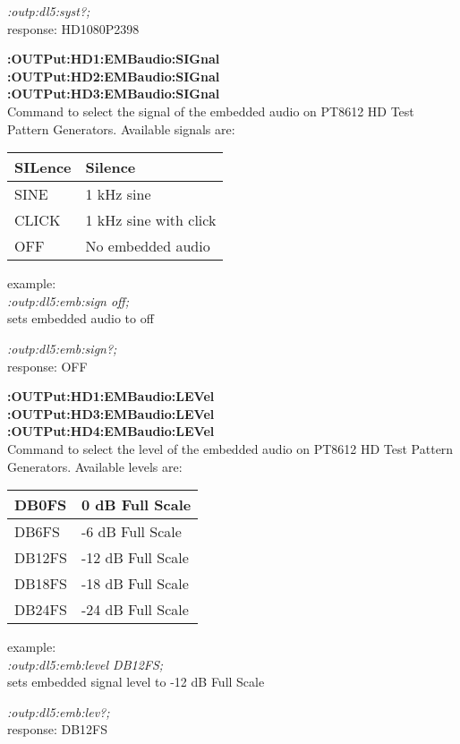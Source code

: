 \textit{:outp:dl5:syst?;}\\
response: HD1080P2398

\textbf{:OUTPut:HD1:EMBaudio:SIGnal}\\
\textbf{:OUTPut:HD2:EMBaudio:SIGnal}\\
\textbf{:OUTPut:HD3:EMBaudio:SIGnal}\\
Command to select the signal of the embedded audio on PT8612 HD Test Pattern Generators.  Available signals are:

\begin{tabular}{|l|l|}
\hline
SILence  &   Silence				\\ \hline
SINE     &   1 kHz sine				\\ \hline
CLICK    &   1 kHz sine with click	\\ \hline
OFF      &   No embedded audio\\ \hline
\end{tabular}

example:\\
\textit{:outp:dl5:emb:sign off;}\\
sets embedded audio to off

\textit{:outp:dl5:emb:sign?;}\\
response: OFF

\textbf{:OUTPut:HD1:EMBaudio:LEVel}\\
\textbf{:OUTPut:HD3:EMBaudio:LEVel}\\
\textbf{:OUTPut:HD4:EMBaudio:LEVel}\\
Command to select the level of the embedded audio on PT8612 HD Test Pattern Generators.  Available levels are:

\begin{tabular}{|l|l|}
\hline
DB0FS  &    0 dB Full Scale\\ \hline
DB6FS  &   -6 dB Full Scale\\ \hline
DB12FS &  -12 dB Full Scale \\ \hline
DB18FS &  -18 dB Full Scale \\ \hline
DB24FS &  -24 dB Full Scale \\ \hline
\end{tabular}

example:\\
\textit{:outp:dl5:emb:level DB12FS;}\\
sets embedded signal level to -12 dB Full Scale

\textit{:outp:dl5:emb:lev?;}\\
response: DB12FS

